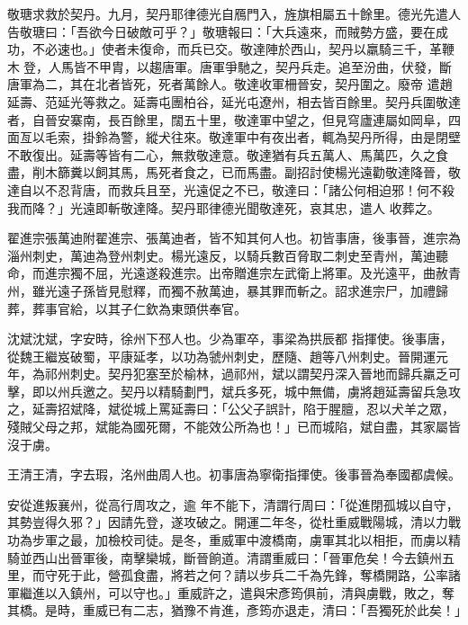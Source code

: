 \begin{pinyinscope}
 敬瑭求救於契丹。九月，契丹耶律德光自鴈門入，旌旗相屬五十餘里。德光先遣人告敬瑭曰：「吾欲今日破敵可乎？」敬瑭報曰：「大兵遠來，而賊勢方盛，要在成功，不必速也。」使者未復命，而兵已交。敬達陣於西山，契丹以羸騎三千，革鞭木登，人馬皆不甲胄，以趨唐軍。唐軍爭馳之，契丹兵走。追至汾曲，伏發，斷唐軍為二，其在北者皆死，死者萬餘人。敬達收軍柵晉安，契丹圍之。廢帝
 遣趙延壽、范延光等救之。延壽屯團柏谷，延光屯遼州，相去皆百餘里。契丹兵圍敬達者，自晉安寨南，長百餘里，闊五十里，敬達軍中望之，但見穹廬連屬如岡阜，四面亙以毛索，掛鈴為警，縱犬往來。敬達軍中有夜出者，輒為契丹所得，由是閉壁不敢復出。延壽等皆有二心，無救敬達意。敬達猶有兵五萬人、馬萬匹，久之食盡，削木篩糞以飼其馬，馬死者食之，已而馬盡。副招討使楊光遠勸敬達降晉，敬達自以不忍背唐，而救兵且至，光遠促之不已，敬達曰：「諸公何相迫邪！何不殺我而降？」光遠即斬敬達降。契丹耶律德光聞敬達死，哀其忠，遣人
 收葬之。



 翟進宗張萬迪附翟進宗、張萬迪者，皆不知其何人也。初皆事唐，後事晉，進宗為淄州刺史，萬迪為登州刺史。楊光遠反，以騎兵數百脅取二刺史至青州，萬迪聽命，而進宗獨不屈，光遠遂殺進宗。出帝贈進宗左武衛上將軍。及光遠平，曲赦青州，雖光遠子孫皆見慰釋，而獨不赦萬迪，暴其罪而斬之。詔求進宗尸，加禮歸葬，葬事官給，以其子仁欽為東頭供奉官。



 沈斌沈斌，字安時，徐州下邳人也。少為軍卒，事梁為拱辰都
 指揮使。後事唐，從魏王繼岌破蜀，平康延孝，以功為虢州刺史，歷隨、趙等八州刺史。晉開運元年，為祁州刺史。契丹犯塞至於榆林，過祁州，斌以謂契丹深入晉地而歸兵羸乏可擊，即以州兵邀之。契丹以精騎劃門，斌兵多死，城中無備，虜將趙延壽留兵急攻之，延壽招斌降，斌從城上罵延壽曰：「公父子誤計，陷于腥膻，忍以犬羊之眾，殘賊父母之邦，斌能為國死爾，不能效公所為也！」已而城陷，斌自盡，其家屬皆沒于虜。



 王清王清，字去瑕，洺州曲周人也。初事唐為寧衛指揮使。後事晉為奉國都虞候。



 安從進叛襄州，從高行周攻之，逾
 年不能下，清謂行周曰：「從進閉孤城以自守，其勢豈得久邪？」因請先登，遂攻破之。開運二年冬，從杜重威戰陽城，清以力戰功為步軍之最，加檢校司徒。是冬，重威軍中渡橋南，虜軍其北以相拒，而虜以精騎並西山出晉軍後，南擊欒城，斷晉餉道。清謂重威曰：「晉軍危矣！今去鎮州五里，而守死于此，營孤食盡，將若之何？請以步兵二千為先鋒，奪橋開路，公率諸軍繼進以入鎮州，可以守也。」重威許之，遣與宋彥筠俱前，清與虜戰，敗之，奪其橋。是時，重威已有二志，猶豫不肯進，彥筠亦退走，清曰：「吾獨死於此矣！」




\end{pinyinscope}
